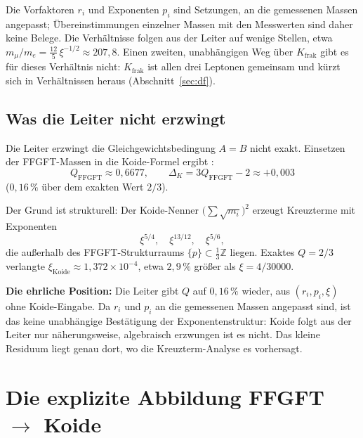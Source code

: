 Die Vorfaktoren \(r_i\) und Exponenten \(p_i\) sind Setzungen, an die
gemessenen Massen angepasst; Übereinstimmungen einzelner Massen mit den
Messwerten sind daher keine Belege. Die Verhältnisse folgen aus der Leiter
auf wenige Stellen, etwa
\(m_\mu/m_e = \tfrac{12}{5}\,\xi^{-1/2} \approx 207{,}8\).
Einen zweiten, unabhängigen Weg über \(K_{\text{frak}}\) gibt es für
dieses Verhältnis nicht: \(K_{\text{frak}}\) ist allen drei Leptonen
gemeinsam und kürzt sich in Verhältnissen heraus
(Abschnitt~\ref{sec:df}).

\subsection*{Was die Leiter nicht erzwingt}

Die Leiter erzwingt die Gleichgewichtsbedingung \(A = B\) nicht exakt.
Einsetzen der FFGFT-Massen in die Koide-Formel ergibt \cite{PascherDok192}:
\begin{equation}
  Q_{\text{FFGFT}} \approx 0{,}6677,
  \qquad
  \Delta_K = 3Q_{\text{FFGFT}} - 2 \approx +0{,}003
\end{equation}
(\(0{,}16\,\%\) über dem exakten Wert \(2/3\)).

Der Grund ist strukturell: Der Koide-Nenner \(\bigl(\sum\sqrt{m_i}\bigr)^2\)
erzeugt Kreuzterme mit Exponenten
\begin{equation}
  \xi^{5/4}, \quad \xi^{13/12}, \quad \xi^{5/6},
\end{equation}
die außerhalb des FFGFT-Strukturraums
\(\{p\} \subset \tfrac{1}{3}\mathbb{Z}\) liegen.
Exaktes \(Q = 2/3\) verlangte \(\xi_{\text{Koide}} \approx 1{,}372\times10^{-4}\),
etwa \(2{,}9\,\%\) größer als \(\xi = 4/30000\).

\textbf{Die ehrliche Position:}
Die Leiter gibt \(Q\) auf \(0{,}16\,\%\) wieder, aus
\((r_i, p_i, \xi)\) ohne Koide-Eingabe.
Da \(r_i\) und \(p_i\) an die gemessenen Massen angepasst sind, ist das
keine unabhängige Bestätigung der Exponentenstruktur:
Koide folgt aus der Leiter nur näherungsweise, algebraisch erzwungen ist es nicht.
Das kleine Residuum liegt genau dort,
wo die Kreuzterm-Analyse es vorhersagt.

\section{Die explizite Abbildung FFGFT \texorpdfstring{\(\to\)}{→} Koide}

